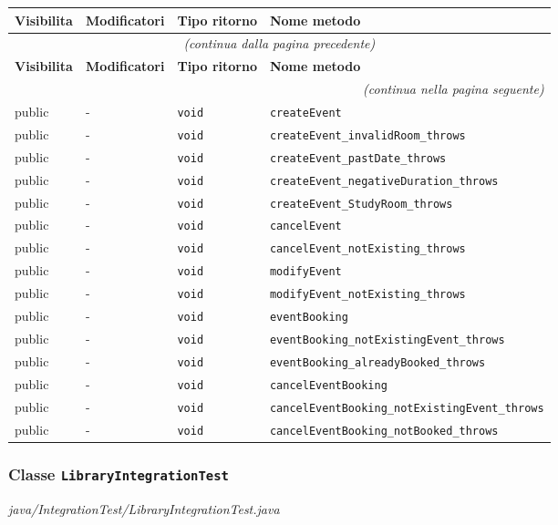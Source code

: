 \begin{longtable}{@{}llll@{}}
\toprule
\textbf{Visibilita} & \textbf{Modificatori} & \textbf{Tipo ritorno} & \textbf{Nome metodo} \\
\midrule
\endfirsthead
\multicolumn{4}{c}{\small\itshape (continua dalla pagina precedente)} \\
\toprule
\textbf{Visibilita} & \textbf{Modificatori} & \textbf{Tipo ritorno} & \textbf{Nome metodo} \\
\midrule
\endhead
\midrule
\multicolumn{4}{r}{\small\itshape (continua nella pagina seguente)} \\
\endfoot
\bottomrule
\endlastfoot
  public & - & \texttt{void} & \texttt{createEvent} \\
  public & - & \texttt{void} & \texttt{createEvent\_invalidRoom\_throws} \\
  public & - & \texttt{void} & \texttt{createEvent\_pastDate\_throws} \\
  public & - & \texttt{void} & \texttt{createEvent\_negativeDuration\_throws} \\
  public & - & \texttt{void} & \texttt{createEvent\_StudyRoom\_throws} \\
  public & - & \texttt{void} & \texttt{cancelEvent} \\
  public & - & \texttt{void} & \texttt{cancelEvent\_notExisting\_throws} \\
  public & - & \texttt{void} & \texttt{modifyEvent} \\
  public & - & \texttt{void} & \texttt{modifyEvent\_notExisting\_throws} \\
  public & - & \texttt{void} & \texttt{eventBooking} \\
  public & - & \texttt{void} & \texttt{eventBooking\_notExistingEvent\_throws} \\
  public & - & \texttt{void} & \texttt{eventBooking\_alreadyBooked\_throws} \\
  public & - & \texttt{void} & \texttt{cancelEventBooking} \\
  public & - & \texttt{void} & \texttt{cancelEventBooking\_notExistingEvent\_throws} \\
  public & - & \texttt{void} & \texttt{cancelEventBooking\_notBooked\_throws} \\
\end{longtable}

\subsubsection*{Classe \texttt{LibraryIntegrationTest}}\label{LibraryIntegrationTest}
{\small\textit{java/IntegrationTest/LibraryIntegrationTest.java}}
\vspace{4pt}

